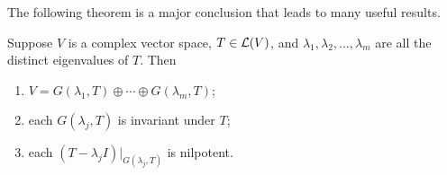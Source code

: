 \begin{rem}
  The following theorem is a major conclusion
  that leads to many useful results.
\end{rem}

\begin{thm}
  \label{thm:operatorDecompositionComplexVectorSpace}
  Suppose $V$ is a complex vector space,
  $T\in {\cal L}(V)$, 
  and $\lambda_1, \lambda_2, \ldots, \lambda_m$
  are all the distinct eigenvalues of $T$.
  Then
  \begin{enumerate}[(DOC-1)]\itemsep0em
  \item $V=G(\lambda_1,T)\oplus \cdots \oplus G(\lambda_m, T)$;
  \item each $G(\lambda_j, T)$ is invariant under $T$;
  \item each $(T-\lambda_jI)|_{G(\lambda_j, T)}$ is nilpotent.
  \end{enumerate}
\end{thm}
